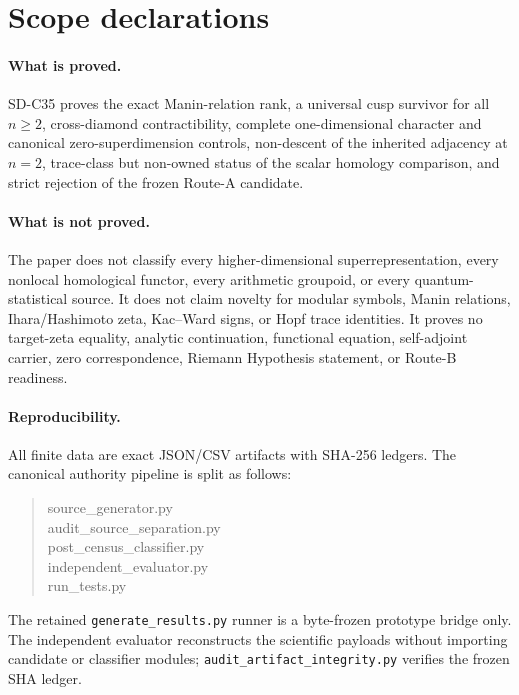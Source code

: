 \section{Scope declarations}

\paragraph{What is proved.}
SD-C35 proves the exact Manin-relation rank, a universal cusp survivor for
all $n\ge2$, cross-diamond contractibility, complete one-dimensional character
and canonical zero-superdimension controls, non-descent of the inherited
adjacency at $n=2$, trace-class but non-owned status of the scalar homology
comparison, and strict rejection of the frozen Route-A candidate.

\paragraph{What is not proved.}
The paper does not classify every higher-dimensional superrepresentation,
every nonlocal homological functor, every arithmetic groupoid, or every
quantum-statistical source.  It does not claim novelty for modular symbols,
Manin relations, Ihara/Hashimoto zeta, Kac--Ward signs, or Hopf trace
identities.  It proves no target-zeta equality, analytic continuation,
functional equation, self-adjoint carrier, zero correspondence, Riemann
Hypothesis statement, or Route-B readiness.

\paragraph{Reproducibility.}
All finite data are exact JSON/CSV artifacts with SHA-256 ledgers.  The
canonical authority pipeline is split as follows:
\begin{quote}
\small\ttfamily
source\_generator.py\\
audit\_source\_separation.py\\
post\_census\_classifier.py\\
independent\_evaluator.py\\
run\_tests.py
\end{quote}
The retained \texttt{generate\_results.py} runner is a byte-frozen prototype
bridge only.
The independent evaluator reconstructs the scientific payloads without
importing candidate or classifier modules; \texttt{audit\_artifact\_integrity.py}
verifies the frozen SHA ledger.

